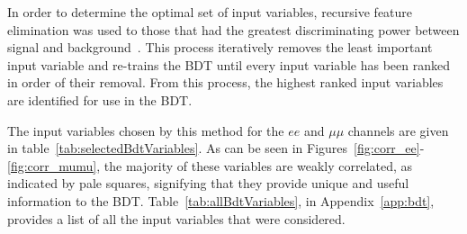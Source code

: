 In order to determine the optimal set of input variables, recursive feature elimination was used to those that had the greatest discriminating power between signal and background~\cite{Guyon2002}.
This process iteratively removes the least important input variable and re-trains the BDT until every input variable has been ranked in order of their removal.
From this process, the highest ranked input variables are identified for use in the BDT.

The input variables chosen by this method for the $ee$ and $\mu\mu$ channels are given in table~\ref{tab:selectedBdtVariables}.
As can be seen in Figures~\ref{fig:corr_ee}-\ref{fig:corr_mumu}, the majority of these variables are weakly correlated, as indicated by pale squares, signifying that they provide unique and useful information to the BDT.
Table~\ref{tab:allBdtVariables}, in Appendix~\ref{app:bdt}, provides a list of all the input variables that were considered.

